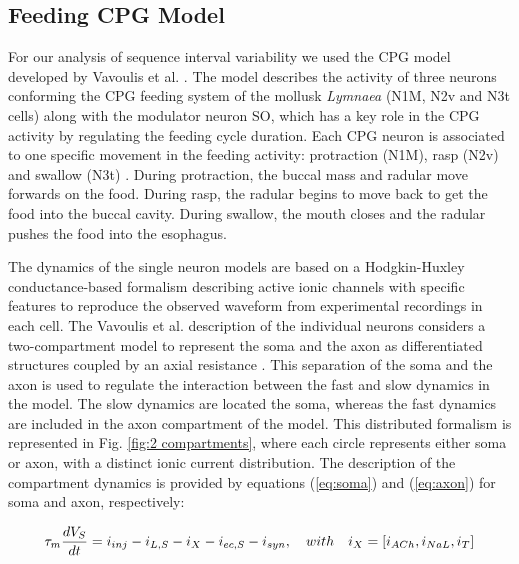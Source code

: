 
\subsection{Feeding CPG Model}
For our analysis of sequence interval variability we used the CPG model developed by Vavoulis et al. \cite{Vavoulis2007}. The model describes the activity of  three neurons conforming the CPG feeding system of the mollusk \textit{Lymnaea} (N1M, N2v and N3t cells) along with the modulator neuron SO, which has a key role in the CPG activity by regulating the feeding cycle duration. Each CPG neuron is associated to one specific movement in the feeding activity: protraction (N1M), rasp (N2v) and swallow (N3t) \cite{Benjamin2012}. During protraction, the buccal mass and radular move forwards on the food. During rasp, the radular begins to move back to get the food into the buccal cavity. During swallow, the mouth closes and the radular pushes the food into the esophagus.

The dynamics of the single neuron models are based on a Hodgkin-Huxley conductance-based formalism \cite{HODGKIN1952} describing active ionic channels with specific features to reproduce the observed waveform from experimental recordings in each cell.
The Vavoulis et al. description of the individual neurons considers a two-compartment model to represent the soma and the axon as  differentiated structures coupled by an axial resistance \cite{Vavoulis2007}. This separation of the soma and the axon is used to regulate the interaction between the fast and slow dynamics in the model. The slow dynamics are located the soma, whereas the fast dynamics are included in the axon compartment of the model. This distributed formalism is represented in Fig. \ref{fig:2 compartments}, where each circle represents either soma or axon, with a distinct ionic current distribution. The description of the compartment dynamics is provided by equations (\ref{eq:soma}) and (\ref{eq:axon}) for soma and axon, respectively: 

\begin{equation}
    \tau_m\frac{dV_S}{dt} = i_{inj} - i_{L,S} - i_X - i_{ec,S} - i_{syn} \\,
    \quad with \quad i_X = [i_{ACh},i_{NaL},i_T]
    \label{eq:soma}
\end{equation}

